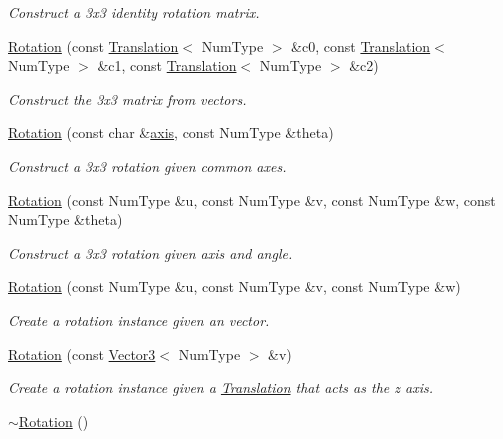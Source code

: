 \begin{DoxyCompactItemize}
\begin{DoxyCompactList}\small\item\em Construct a 3x3 identity rotation matrix. \end{DoxyCompactList}\item 
\hyperlink{classscrews_1_1_rotation_a39ea7087dcc2a48f2b937e97ce42ff00}{Rotation} (const \hyperlink{singletonscrews_1_1_translation}{Translation}$<$ Num\+Type $>$ \&c0, const \hyperlink{singletonscrews_1_1_translation}{Translation}$<$ Num\+Type $>$ \&c1, const \hyperlink{singletonscrews_1_1_translation}{Translation}$<$ Num\+Type $>$ \&c2)
\begin{DoxyCompactList}\small\item\em Construct the 3x3 matrix from vectors. \end{DoxyCompactList}\item 
\hyperlink{classscrews_1_1_rotation_a907da04fc1292357510ed18e9b25c05b}{Rotation} (const char \&\hyperlink{classscrews_1_1_rotation_ae86a970692594f7333dfd3d6586b35fb}{axis}, const Num\+Type \&theta)
\begin{DoxyCompactList}\small\item\em Construct a 3x3 rotation given common axes. \end{DoxyCompactList}\item 
\hyperlink{classscrews_1_1_rotation_ace6adb2eb5341e8809ece4423af8dd39}{Rotation} (const Num\+Type \&u, const Num\+Type \&v, const Num\+Type \&w, const Num\+Type \&theta)
\begin{DoxyCompactList}\small\item\em Construct a 3x3 rotation given axis and angle. \end{DoxyCompactList}\item 
\hyperlink{classscrews_1_1_rotation_a3baaabf99f62c5ff6df6efd9283f8d03}{Rotation} (const Num\+Type \&u, const Num\+Type \&v, const Num\+Type \&w)
\begin{DoxyCompactList}\small\item\em Create a rotation instance given an vector. \end{DoxyCompactList}\item 
\hyperlink{classscrews_1_1_rotation_a25d972ab6641c4139f754e938688cdd9}{Rotation} (const \hyperlink{singletonscrews_1_1_translation}{Vector3}$<$ Num\+Type $>$ \&v)
\begin{DoxyCompactList}\small\item\em Create a rotation instance given a \hyperlink{singletonscrews_1_1_translation}{Translation} that acts as the z axis. \end{DoxyCompactList}\item 
\hypertarget{classscrews_1_1_rotation_a3bb8420743bb0b26a40fd99827699b81}{\hyperlink{classscrews_1_1_rotation_a3bb8420743bb0b26a40fd99827699b81}{$\sim$\+Rotation} ()}\label{classscrews_1_1_rotation_a3bb8420743bb0b26a40fd99827699b81}


\end{DoxyCompactItemize}

